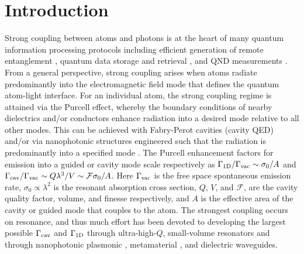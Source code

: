 \documentclass[preprint, aps,pra,onecolumn]{revtex4-1} %
\newcommand{\oneD}{{\rm 1D}}
\newcommand{\vac}{{\rm vac}}
\newcommand{\cav}{{\rm cav}}
\begin{document}
\maketitle

\section{Introduction}

Strong coupling between atoms and photons is at the heart of many quantum information processing protocols including efficient generation of remote entanglement \cite{duan_long-distance_2001, julsgaard_experimental_2001}, quantum data storage and retrieval \cite{ eisaman_electromagnetically_2005}, and QND measurements \cite{eckert_quantum_2008}.  
From a general perspective, strong coupling arises when atoms radiate predominantly into the electromagnetic field mode that defines the quantum atom-light interface.  
For an individual atom, the strong coupling regime is attained via the Purcell effect, whereby the boundary conditions of nearby dielectrics and/or conductors enhance radiation into a desired mode relative to all other modes.  
This can be achieved with Fabry-Perot cavities (cavity QED) \cite{miller_trapped_2005} and/or via nanophotonic structures engineered such that the radiation is predominantly into a specified mode \cite{manga_rao_single_2007, hakuta_manipulating_2012, hung_trapped_2013}.  The Purcell enhancement factors for emission into a guided or cavity mode scale respectively as  $ \Gamma_{\oneD}/\Gamma_{\vac} \sim \sigma_0/A$ and  $\Gamma_{\cav}/\Gamma_{\vac} \sim   Q \lambda^3/V \sim \mathcal{F}  \sigma_0/A$.  Here $\Gamma_{\vac}$ is the free space spontaneous emission rate, $\sigma_0 \propto \lambda^2$ is the resonant absorption cross section, $Q$, $V$, and $\mathcal{F}$,  are the cavity quality factor, volume, and finesse respectively, and $A$ is the effective area of the cavity or guided mode that couples to the atom.  The strongest coupling occurs on resonance, and thus much effort has been devoted to developing the largest possible $\Gamma_{\cav}$ and $\Gamma_{\oneD}$ through ultra-high-$Q$, small-volume resonators \cite{raimond_manipulating_2001, wallraff_strong_2004, miller_trapped_2005} and through nanophotonic plasmonic \cite{dzsotjan_quantum_2010, tame_quantum_2013}, metamaterial \cite{yao_ultrahigh_2009}, and dielectric \cite{hung_trapped_2013, goban_atomlight_2014} waveguides.   
\end{document}
